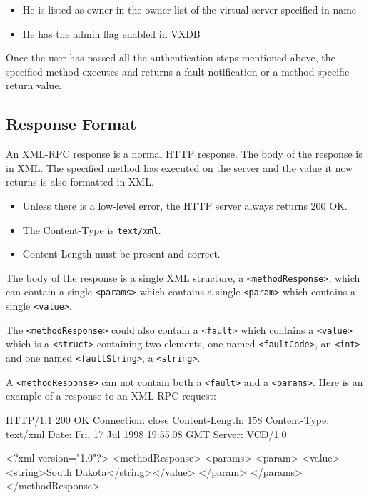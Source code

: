 \begin{itemize}
\item He is listed as owner in the owner list of the virtual server specified in name
\item He has the admin flag enabled in VXDB
\end{itemize}

Once the user has passed all the authentication steps mentioned above, the
specified method executes and returns a fault notification or a method specific
return value.


\subsection{Response Format}

An XML-RPC response is a normal HTTP response. The body of the response is in
XML. The specified method has executed on the server and the value it now
returns is also formatted in XML.

\begin{itemize}
\item Unless there is a low-level error, the HTTP server always returns 200 OK.
\item The Content-Type is \verb,text/xml,.
\item Content-Length must be present and correct.
\end{itemize}

The body of the response is a single XML structure, a \verb,<methodResponse>,,
which can contain a single \verb,<params>, which contains a single
\verb,<param>, which contains a single \verb,<value>,.

The \verb,<methodResponse>, could also contain a \verb,<fault>, which contains
a \verb,<value>, which is a \verb,<struct>, containing two elements, one named
\verb,<faultCode>,, an \verb,<int>, and one named \verb,<faultString>,, a
\verb,<string>,.

A \verb,<methodResponse>, can not contain both a \verb,<fault>, and a \verb,<params>,. Here is an
example of a response to an XML-RPC request:

\begin{lstverbatim}
HTTP/1.1 200 OK
Connection: close
Content-Length: 158
Content-Type: text/xml
Date: Fri, 17 Jul 1998 19:55:08 GMT
Server: VCD/1.0

<?xml version="1.0"?>
<methodResponse>
  <params>
    <param>
      <value><string>South Dakota</string></value>
    </param>
  </params>
</methodResponse>
\end{lstverbatim}

